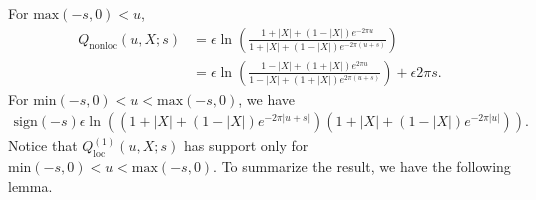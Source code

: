 \documentclass[a4paper,11pt]{article}
\theoremstyle{definition}
\theoremstyle{remark}
\begin{document}
For $\text{max}(-s,0)<u$,
\begin{align}    
    Q_{\text{nonloc}}(u,X;s) &= \epsilon\ln\left( \frac{1+|X| +(1-|X|)e^{-2\pi u}}{1+|X| +(1-|X|)e^{-2\pi(u+s)}}\right) \\
    &= \epsilon\ln\left( \frac{1-|X| + (1+|X|)e^{2\pi u} }{1-|X| + (1+|X|)e^{2\pi(u+s)} }\right) +\epsilon2\pi s.
\end{align}
For $\text{min}(-s,0)<u<\text{max}(-s,0)$, we have
\begin{align}
    \text{sign}(-s)\epsilon\ln\left(({1+|X| +(1-|X|)e^{-2\pi|u+s|}})({1+|X| +(1-|X|)e^{-2\pi|u|}})\right).
\end{align}
Notice that $Q^{(1)}_{\text{loc}}(u,X;s)$ has support only for $\text{min}(-s,0)<u<\text{max}(-s,0)$.
To summarize the result, we have the following lemma.
\end{document}
